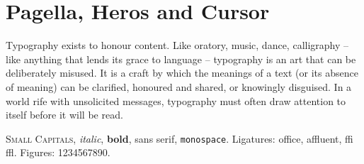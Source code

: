 \documentclass[11pt,a4paper]{article}
\begin{document}
\section{Pagella, Heros and Cursor}
Typography exists to honour content. Like oratory, music, dance, calligraphy -- like anything that lends its grace to language -- typography is an art that can be deliberately misused. It is a craft by which the meanings of a text (or its absence of meaning) can be clarified, honoured and shared, or knowingly disguised. In a world rife with unsolicited messages, typography must often draw attention to itself before it will be read.

\textsc{Small Capitals}, \textit{italic}, \textbf{bold}, \textsf{sans serif}, \texttt{monospace}.
Ligatures: office, affluent, ffi ffl. Figures: 1234567890.

\lipsum[1-3]
\end{document}
